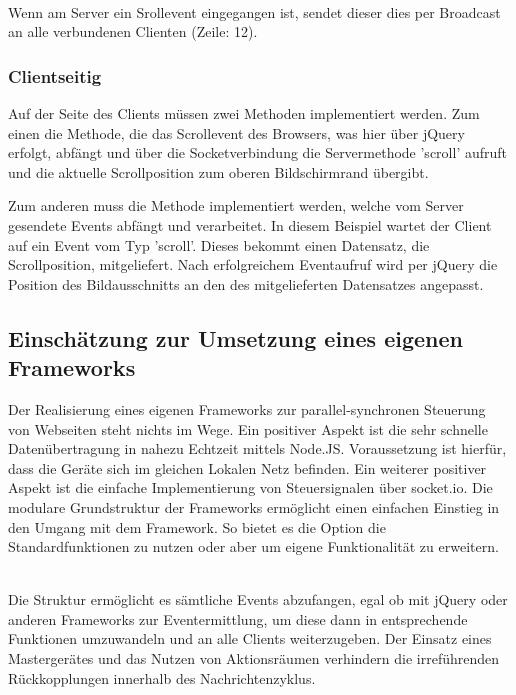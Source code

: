 	\\Wenn am Server ein Srollevent eingegangen ist, sendet dieser dies per Broadcast an alle verbundenen Clienten (Zeile: 12).
	
	\subsubsection{Clientseitig}
	Auf der Seite des Clients müssen zwei Methoden implementiert werden. Zum einen die Methode, die das Scrollevent des Browsers, was hier über jQuery erfolgt, abfängt und über die Socketverbindung die Servermethode 'scroll' aufruft und die aktuelle Scrollposition zum oberen Bildschirmrand übergibt.
	
	
	Zum anderen muss die Methode implementiert werden, welche vom Server gesendete \Gls{Event}s abfängt und verarbeitet. In diesem Beispiel wartet der Client auf ein \Gls{Event} vom Typ 'scroll'. Dieses bekommt einen Datensatz, die Scrollposition, mitgeliefert. Nach erfolgreichem \Gls{Event}aufruf wird per jQuery die Position des Bildausschnitts an den des mitgelieferten Datensatzes angepasst.
	

	\subsection{Einschätzung zur Umsetzung eines eigenen \Gls{Framework}s}
	Der Realisierung eines eigenen \Gls{Framework}s zur \Gls{parallel-synchron}en Steuerung von Webseiten steht nichts im Wege. Ein positiver Aspekt ist die sehr schnelle Datenübertragung in nahezu Echtzeit mittels Node.JS. Voraussetzung ist hierfür, dass die Geräte sich im gleichen Lokalen Netz befinden. Ein weiterer positiver Aspekt ist die einfache Implementierung von Steuersignalen über socket.io. Die modulare Grundstruktur der \Gls{Framework}s ermöglicht einen einfachen Einstieg in den Umgang mit dem \Gls{Framework}. So bietet es die Option die Standardfunktionen zu nutzen oder aber um eigene Funktionalität zu erweitern.

\\Die Struktur ermöglicht es sämtliche \Gls{Event}s abzufangen, egal ob mit jQuery oder anderen \Gls{Framework}s zur \Gls{Event}ermittlung, um diese dann in entsprechende Funktionen umzuwandeln und an alle Clients weiterzugeben. Der Einsatz eines Mastergerätes und das Nutzen von Aktionsräumen verhindern die irreführenden Rückkopplungen innerhalb des Nachrichtenzyklus. 

